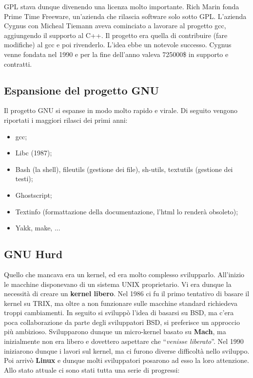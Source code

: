 GPL stava dunque divenendo una licenza molto importante. Rich Marin fonda Prime Time Freeware, un'azienda che rilascia software solo sotto GPL. L'azienda Cygnus con Micheal Tiemann aveva cominciato a lavorare al progetto gcc, aggiungendo il supporto al C++. Il progetto era quella di contribuire (fare modifiche) al gcc e poi rivenderlo. L'idea ebbe un notevole successo. Cygnus venne fondata nel 1990 e per la fine dell'anno valeva 725000\$ in supporto e contratti.

\subsection{Espansione del progetto GNU}

Il progetto GNU si espanse in modo molto rapido e virale. Di seguito vengono riportati i maggiori rilasci dei primi anni:

\begin{itemize}
	
	\item gcc;
	\item Libc (1987);
	\item Bash (la shell), fileutils (gestione dei file), sh-utils, textutils (gestione dei testi);
	\item Ghostscript;
	\item Textinfo (formattazione della documentazione, l'html lo renderà obsoleto);
	\item Yakk, make, ...
	
\end{itemize}

\subsection{GNU Hurd}

Quello che mancava era un kernel, ed era molto complesso svilupparlo. All'inizio le macchine disponevano di un sistema UNIX proprietario. Vi era dunque la necessità di creare un \textbf{kernel libero}. Nel 1986 ci fu il primo tentativo di basare il kernel su TRIX, ma oltre a non funzionare sulle macchine standard richiedeva troppi cambiamenti. In seguito si sviluppò l'idea di basarsi su BSD, ma c'era poca collaborazione da parte degli sviluppatori BSD, si preferisce un approccio più ambizioso.
Svilupparono dunque un micro-kernel basato su \textbf{Mach}, ma inizialmente non era libero e dovettero aspettare che ``\textit{venisse liberato}''. Nel 1990 iniziarono dunque i lavori sul kernel, ma ci furono diverse difficoltà nello sviluppo. Poi arrivò \textbf{Linux} e dunque molti sviluppatori posarono ad esso la loro attenzione. Allo stato attuale ci sono stati tutta una serie di progressi:

